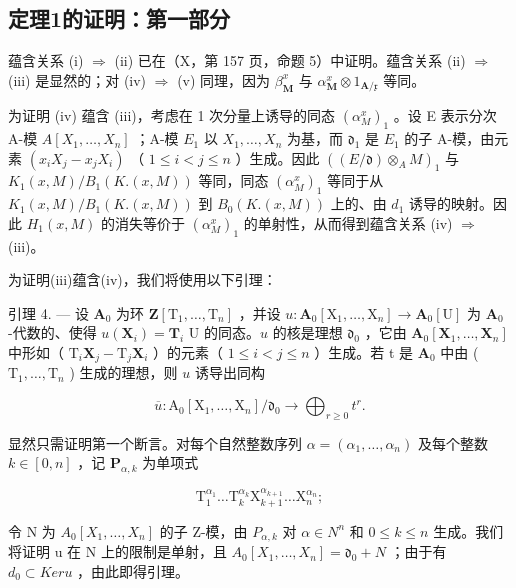 \subsection{定理1的证明：第一部分}

蕴含关系 (i) \(\Rightarrow\) (ii) 已在（X，第 157 页，命题 5）中证明。蕴含关系 (ii) \(\Rightarrow\) (iii) 是显然的；对 (iv) \(\Rightarrow\) (v) 同理，因为 \(\beta_{\mathbf{M}}^{x}\) 与 \(\alpha_{\mathbf{M}}^{x} \otimes 1_{\mathbf{A}/\mathfrak{x}}\) 等同。

为证明 (iv) 蕴含 (iii)，考虑在 1 次分量上诱导的同态 \((\alpha_{M}^{x})_{1}\) 。设 E 表示分次 A-模 \(A[X_{1},\ldots,X_{n}]\) ；A-模 \(E_{1}\) 以 \(X_{1},\ldots,X_{n}\) 为基，而 \(\mathfrak{d}_{1}\) 是 \(E_{1}\) 的子 A-模，由元素 \((x_{i}X_{j}-x_{j}X_{i})\) （ \(1\leqslant i<j\leqslant n\) ）生成。因此 \(((E/\mathfrak{d})\otimes_{A}M)_{1}\) 与 \(K_{1}(x,M)/B_{1}(K.(x,M))\) 等同，同态 \((\alpha_{M}^{x})_{1}\) 等同于从 \(K_{1}(x,M)/B_{1}(K.(x,M))\) 到 \(B_{0}(K.(x,M))\) 上的、由 \(d_{1}\) 诱导的映射。因此 \(H_{1}(x,M)\) 的消失等价于 \((\alpha_{M}^{x})_{1}\) 的单射性，从而得到蕴含关系 (iv) \(\Rightarrow\) (iii)。

为证明(iii)蕴含(iv)，我们将使用以下引理：

引理 4. --- 设 \(\mathbf{A}_{0}\) 为环 \(\mathbf{Z}[\mathrm{T}_{1},\ldots,\mathrm{T}_{n}]\) ，并设 \(u:\mathbf{A}_{0}[\mathrm{X}_{1},\ldots,\mathrm{X}_{n}] \to \mathbf{A}_{0}[\mathrm{U}]\) 为 \(\mathbf{A}_{0}\) -代数的、使得 \(u(\mathbf{X}_{i}) = \mathbf{T}_{i}\) U 的同态。\(u\) 的核是理想 \(\mathfrak{d}_{0}\) ，它由 \(\mathbf{A}_{0}[\mathbf{X}_{1},\ldots,\mathbf{X}_{n}]\) 中形如（ \(\mathrm{T}_{i}\mathbf{X}_{j}-\mathrm{T}_{j}\mathbf{X}_{i}\) ）的元素（ \(1 \leqslant i < j \leqslant n\) ）生成。若 t 是 \(\mathbf{A}_{0}\) 中由 ( \(\mathrm{T}_{1},\ldots,\mathrm{T}_{n}\) ) 生成的理想，则 \(u\) 诱导出同构

\[
\overline {{u}}: \mathrm{A} _ {0} [ \mathrm{X} _ {1}, \dots , \mathrm{X} _ {n} ] / \mathfrak {d} _ {0} \rightarrow \bigoplus_ {r \geqslant 0} t ^ {r}.
\]

显然只需证明第一个断言。对每个自然整数序列 \(\alpha = (\alpha_{1},\ldots,\alpha_{n})\) 及每个整数 \(k\in[0,n]\) ，记 \(\mathbf{P}_{\alpha,k}\) 为单项式

\[
\mathrm{T} _ {1} ^ {\alpha_ {1}} \dots \mathrm{T} _ {k} ^ {\alpha_ {k}} \mathrm{X} _ {k + 1} ^ {\alpha_ {k + 1}} \dots \mathrm{X} _ {n} ^ {\alpha_ {n}};
\]

令 N 为 \(A_{0}[X_{1}, \ldots, X_{n}]\) 的子 Z-模，由 \(P_{\alpha,k}\) 对 \(\alpha \in N^{n}\) 和 \(0 \leqslant k \leqslant n\) 生成。我们将证明 u 在 N 上的限制是单射，且 \(A_{0}[X_{1}, \ldots, X_{n}] = \mathfrak{d}_{0} + N\) ；由于有 \(d_{0} \subset Ker u\) ，由此即得引理。

